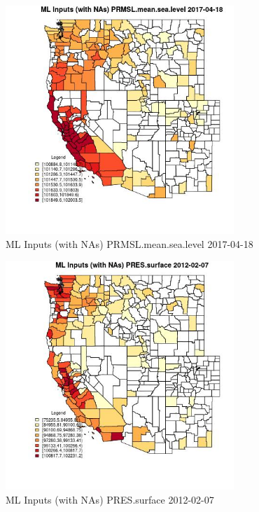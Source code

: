 \begin{figure} 
\centering  
\includegraphics[width=0.77\textwidth]{Code_Outputs/Report_ML_input_PM25_Step4_part_f_de_duplicated_aveswNAs_CountyPRMSLmeansealevelMean2017-04-18.jpg} 
\caption{\label{fig:Report_ML_input_PM25_Step4_part_f_de_duplicated_aveswNAsCountyPRMSLmeansealevelMean2017-04-18}ML Inputs (with NAs) PRMSL.mean.sea.level 2017-04-18} 
\end{figure} 
 

\begin{figure} 
\centering  
\includegraphics[width=0.77\textwidth]{Code_Outputs/Report_ML_input_PM25_Step4_part_f_de_duplicated_aveswNAs_CountyPRESsurfaceMean2012-02-07.jpg} 
\caption{\label{fig:Report_ML_input_PM25_Step4_part_f_de_duplicated_aveswNAsCountyPRESsurfaceMean2012-02-07}ML Inputs (with NAs) PRES.surface 2012-02-07} 
\end{figure} 
 

